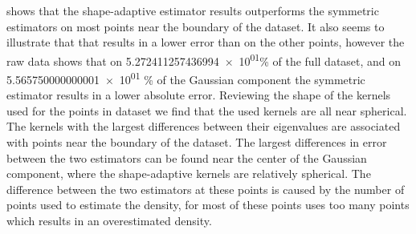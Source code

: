 		





		 shows that the shape-adaptive estimator results outperforms the symmetric estimators on most points near the boundary of the dataset. It also seems to illustrate that that \mbe results in a lower error than \sambe on the other points, however the raw data shows that on \num{5.272411257436994e+01}\% of the full dataset, and on \num{5.565750000000001e+01} \% of the Gaussian component the symmetric estimator results in a lower absolute error.
		Reviewing the shape of the kernels used for the points in dataset \ferdosiOne we find that the used kernels are all near spherical. The kernels with the largest differences between their eigenvalues are associated with points near the boundary of the dataset. 
		The largest differences in error between the two estimators can be found near the center of the Gaussian component, where the shape-adaptive kernels are relatively spherical. The difference between the two estimators at these points is caused by the number of points used to estimate the density, for most of these points \sambe uses too many points which results in an overestimated density. 



